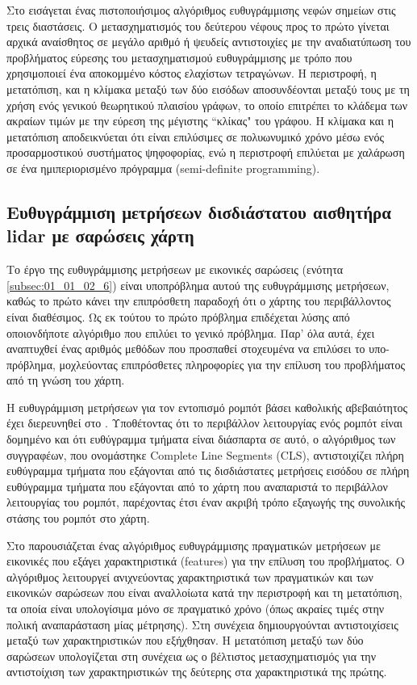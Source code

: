 Στο \cite{Yang2021} εισάγεται ένας πιστοποιήσιμος αλγόριθμος ευθυγράμμισης
νεφών σημείων στις τρεις διαστάσεις. Ο μετασχηματισμός του δεύτερου νέφους προς
το πρώτο γίνεται αρχικά αναίσθητος σε μεγάλο αριθμό ή ψευδείς αντιστοιχίες με
την αναδιατύπωση του προβλήματος εύρεσης του μετασχηματισμού ευθυγράμμισης με
τρόπο που χρησιμοποιεί ένα αποκομμένο κόστος ελαχίστων τετραγώνων. Η
περιστροφή, η μετατόπιση, και η κλίμακα μεταξύ των δύο εισόδων αποσυνδέονται
μεταξύ τους με τη χρήση ενός γενικού θεωρητικού πλαισίου γράφων, το οποίο
επιτρέπει το κλάδεμα των ακραίων τιμών με την εύρεση της μέγιστης ``κλίκας" του
γράφου.  Η κλίμακα και η μετατόπιση αποδεικνύεται ότι είναι επιλύσιμες σε
πολυωνυμικό χρόνο μέσω ενός προσαρμοστικού συστήματος ψηφοφορίας, ενώ η
περιστροφή επιλύεται με χαλάρωση σε ένα ημιπεριορισμένο πρόγραμμα
(semi-definite programming).

\subsection{Ευθυγράμμιση μετρήσεων δισδιάστατου αισθητήρα lidar με σαρώσεις
χάρτη}
\label{subsection:02_02_02:2}

Το έργο της ευθυγράμμισης μετρήσεων με εικονικές σαρώσεις (ενότητα
\ref{subsec:01_01_02_6}) είναι υποπρόβλημα αυτού της ευθυγράμμισης μετρήσεων,
καθώς το πρώτο κάνει την επιπρόσθετη παραδοχή ότι ο χάρτης του περιβάλλοντος
είναι διαθέσιμος. Ως εκ τούτου το πρώτο πρόβλημα επιδέχεται λύσης από
οποιονδήποτε αλγόριθμο που επιλύει το γενικό πρόβλημα. Παρ' όλα αυτά, έχει
αναπτυχθεί ένας αριθμός μεθόδων που προσπαθεί στοχευμένα να επιλύσει το
υπο-πρόβλημα, μοχλεύοντας επιπρόσθετες πληροφορίες για την επίλυση του
προβλήματος από τη γνώση του χάρτη.

Η ευθυγράμμιση μετρήσεων για τον εντοπισμό ρομπότ βάσει καθολικής αβεβαιότητος
έχει διερευνηθεί στο \cite{XuZezhong}. Υποθέτοντας ότι το περιβάλλον
λειτουργίας ενός ρομπότ είναι δομημένο και ότι ευθύγραμμα τμήματα είναι
διάσπαρτα σε αυτό, ο αλγόριθμος των συγγραφέων, που ονομάστηκε Complete Line
Segments (CLS), αντιστοιχίζει πλήρη ευθύγραμμα τμήματα που εξάγονται από τις
δισδιάστατες μετρήσεις εισόδου σε πλήρη ευθύγραμμα τμήματα που εξάγονται από το
χάρτη που αναπαριστά το περιβάλλον λειτουργίας του ρομπότ, παρέχοντας έτσι έναν
ακριβή τρόπο εξαγωγής της συνολικής στάσης του ρομπότ στο χάρτη.

Στο \cite{Lingemann2005a} παρουσιάζεται ένας αλγόριθμος ευθυγράμμισης
πραγματικών μετρήσεων με εικονικές που εξάγει χαρακτηριστικά (features) για την
επίλυση του προβλήματος.  Ο αλγόριθμος λειτουργεί ανιχνεύοντας χαρακτηριστικά
των πραγματικών και των εικονικών σαρώσεων που είναι αναλλοίωτα κατά την
περιστροφή και τη μετατόπιση, τα οποία είναι υπολογίσιμα μόνο σε πραγματικό
χρόνο (όπως ακραίες τιμές στην πολική αναπαράσταση μίας μέτρησης). Στη
συνέχεια δημιουργούνται αντιστοιχίσεις μεταξύ των χαρακτηριστικών που
εξήχθησαν. Η μετατόπιση μεταξύ των δύο σαρώσεων υπολογίζεται στη συνέχεια ως ο
βέλτιστος μετασχηματισμός για την αντιστοίχιση των χαρακτηριστικών της δεύτερης
στα χαρακτηριστικά της πρώτης.

